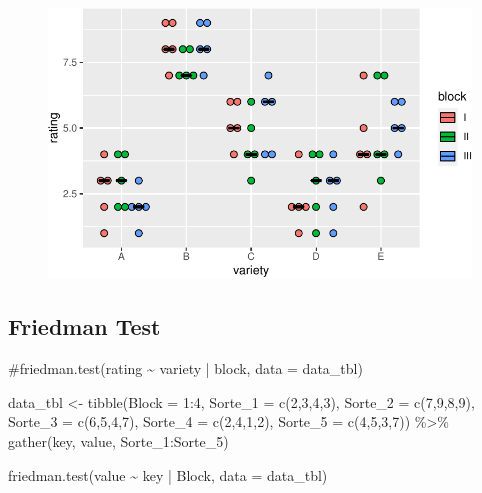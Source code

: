 \documentclass[
  letterpaper,
  DIV=11,
  oneside]{scrreport}
\newenvironment{Shaded}{\begin{snugshade}}{\end{snugshade}}
\newcommand{\AttributeTok}[1]{\textcolor[rgb]{0.40,0.45,0.13}{#1}}
\newcommand{\CommentTok}[1]{\textcolor[rgb]{0.37,0.37,0.37}{#1}}
\newcommand{\DecValTok}[1]{\textcolor[rgb]{0.68,0.00,0.00}{#1}}
\newcommand{\FunctionTok}[1]{\textcolor[rgb]{0.28,0.35,0.67}{#1}}
\newcommand{\NormalTok}[1]{\textcolor[rgb]{0.00,0.23,0.31}{#1}}
\newcommand{\OtherTok}[1]{\textcolor[rgb]{0.00,0.23,0.31}{#1}}
\newcommand{\SpecialCharTok}[1]{\textcolor[rgb]{0.37,0.37,0.37}{#1}}
\begin{document}
\begin{figure}[H]

{\centering \includegraphics{./app-example-analysis_files/figure-pdf/unnamed-chunk-14-1.pdf}

}

\end{figure}

\hypertarget{friedman-test}{%
\subsection{Friedman Test}\label{friedman-test}}

\begin{Shaded}
\begin{Highlighting}[]
\CommentTok{\#friedman.test(rating \textasciitilde{} variety | block, data = data\_tbl)}

\NormalTok{data\_tbl }\OtherTok{\textless{}{-}} \FunctionTok{tibble}\NormalTok{(}\AttributeTok{Block =} \DecValTok{1}\SpecialCharTok{:}\DecValTok{4}\NormalTok{,}
                   \AttributeTok{Sorte\_1 =} \FunctionTok{c}\NormalTok{(}\DecValTok{2}\NormalTok{,}\DecValTok{3}\NormalTok{,}\DecValTok{4}\NormalTok{,}\DecValTok{3}\NormalTok{),}
                   \AttributeTok{Sorte\_2 =} \FunctionTok{c}\NormalTok{(}\DecValTok{7}\NormalTok{,}\DecValTok{9}\NormalTok{,}\DecValTok{8}\NormalTok{,}\DecValTok{9}\NormalTok{),}
                   \AttributeTok{Sorte\_3 =} \FunctionTok{c}\NormalTok{(}\DecValTok{6}\NormalTok{,}\DecValTok{5}\NormalTok{,}\DecValTok{4}\NormalTok{,}\DecValTok{7}\NormalTok{),}
                   \AttributeTok{Sorte\_4 =} \FunctionTok{c}\NormalTok{(}\DecValTok{2}\NormalTok{,}\DecValTok{4}\NormalTok{,}\DecValTok{1}\NormalTok{,}\DecValTok{2}\NormalTok{),}
                   \AttributeTok{Sorte\_5 =} \FunctionTok{c}\NormalTok{(}\DecValTok{4}\NormalTok{,}\DecValTok{5}\NormalTok{,}\DecValTok{3}\NormalTok{,}\DecValTok{7}\NormalTok{)) }\SpecialCharTok{\%\textgreater{}\%}
  \FunctionTok{gather}\NormalTok{(key, value, Sorte\_1}\SpecialCharTok{:}\NormalTok{Sorte\_5)}

\FunctionTok{friedman.test}\NormalTok{(value }\SpecialCharTok{\textasciitilde{}}\NormalTok{ key }\SpecialCharTok{|}\NormalTok{ Block, }\AttributeTok{data =}\NormalTok{ data\_tbl)}
\end{Highlighting}
\end{Shaded}
\end{document}
